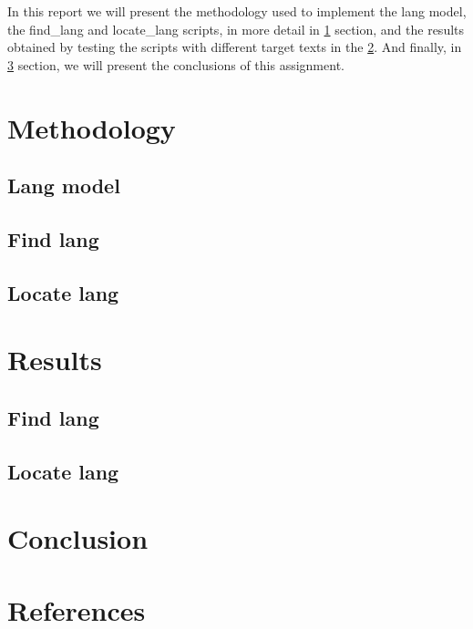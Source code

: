 \documentclass{article}
\begin{document}
In this report we will present the methodology used to implement the lang model, the find_lang and locate_lang scripts, in more detail in \ref*{sec:methodology} section, and the results obtained by testing the scripts with different target texts in the \ref*{sec:results}.
And finally, in \ref*{sec:conclusion} section, we will present the conclusions of this assignment.

\section{Methodology}
\label{sec:methodology}

\subsection{Lang model}
\label{subsec:methodology_lang_model}

\subsection{Find lang}
\label{subsec:methodology_find_lang}

\subsection{Locate lang}
\label{subsec:methodology_locate_lang}

\section{Results}
\label{sec:results}

\subsection{Find lang}
\label{subsec:results_find_lang}

\subsection{Locate lang}
\label{subsec:results_locate_lang}

\section{Conclusion}
\label{sec:conclusion}

\section{References}


\end{document}
